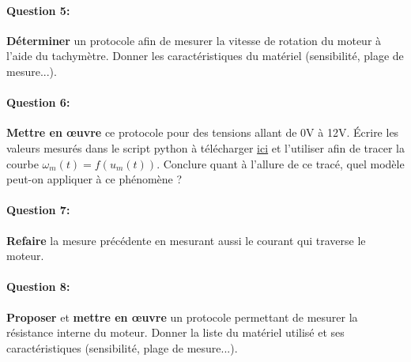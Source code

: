 \paragraph{Question 5:} \textbf{Déterminer} un protocole afin de mesurer la vitesse de rotation du moteur à l'aide du tachymètre. Donner les caractéristiques du matériel (sensibilité, plage de mesure...).

\paragraph{Question 6:} \textbf{Mettre en \oe uvre} ce protocole pour des tensions allant de 0V à 12V. Écrire les valeurs mesurés dans le script python à télécharger 
\href{https://github.com/Costadoat/Sciences-Ingenieur/raw/master/S01\%20\nomsequence/TP01\%20Mod\%C3\%A9lisation\%20lin\%C3\%A9aire/Ilot_01\%20Moteur\%20\%C3\%A0\%20courant\%20continu/01-TP01-I01.py}{ici} 
et l'utiliser afin de tracer la courbe $\omega_m(t)=f(u_m(t))$. Conclure quant à l'allure de ce tracé, quel modèle peut-on appliquer à ce phénomène ?




\paragraph{Question 7:} \textbf{Refaire} la mesure précédente en mesurant aussi le courant qui traverse le moteur.

\paragraph{Question 8:} \textbf{Proposer} et \textbf{mettre en \oe uvre} un protocole permettant de mesurer la résistance interne du moteur. Donner la liste du matériel utilisé et ses caractéristiques (sensibilité, plage de mesure...).

